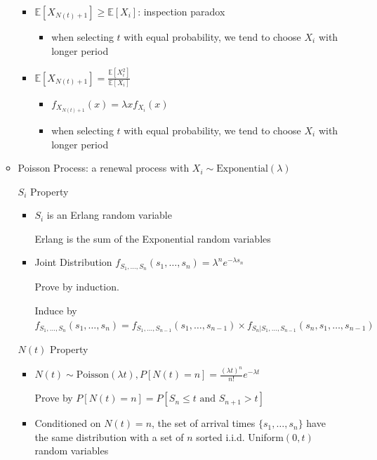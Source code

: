 \documentclass[a4paper]{article}
\begin{document}
\begin{itemize}
\begin{itemize}
\begin{itemize}
                    \item $\mathbb{E}[X_{N(t) + 1}] \geq \mathbb{E}[X_i]$: inspection paradox
                        \begin{itemize}
                            \item when selecting $t$ with equal probability, we tend to choose $X_i$ with longer period
                        \end{itemize}
                    \item $\mathbb{E}[X_{N(t) + 1}] = \frac{\mathbb{E}[X_i^2]}{\mathbb{E}[X_i]}$
                        \begin{itemize}
                            \item $f_{X_{N(t)+1}}(x) = \lambda x f_{X_i}(x)$
                            \item when selecting $t$ with equal probability, we tend to choose $X_i$ with longer period
                        \end{itemize}
                \end{itemize}
            \item Poisson Process: a renewal process with $X_i \sim \text{Exponential}(\lambda)$

                $S_i$ Property
                \begin{itemize}
                    \item $S_i$ is an Erlang random variable

                        Erlang is the sum of the Exponential random variables
                    \item Joint Distribution $f_{S_1, \dots, S_n}(s_1, \dots, s_n) = \lambda^n e^{-\lambda s_n}$

                        Prove by induction.

                        Induce by $f_{S_1, \dots, S_n}(s_1, \dots, s_n) = f_{S_1, \dots, S_{n-1}}(s_1, \dots, s_{n-1}) \times f_{S_n | S_1, \dots, S_{n-1}}(s_n, s_1, \dots, s_{n-1})$
                \end{itemize}
                $N(t)$ Property
                \begin{itemize}
                    \item $N(t) \sim \text{Poisson}(\lambda t), P[N(t) = n] = \frac{(\lambda t)^n}{n!}e^{-\lambda t}$ 

                        Prove by $P[N(t) = n] = P[S_n \leq t \text{ and } S_{n+1} > t]$
                    \item Conditioned on $N(t) = n$, the set of arrival times $\{s_1, \dots, s_n\}$ have the same distribution with a set of $n$ sorted i.i.d. Uniform$(0, t)$ random variables


\end{itemize}
\end{itemize}
\end{itemize}
\end{document}
